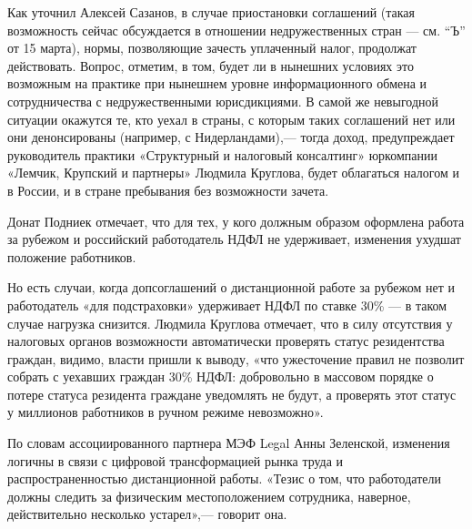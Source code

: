 Как уточнил Алексей Сазанов, в случае приостановки соглашений (такая возможность сейчас обсуждается в отношении недружественных стран — см. “Ъ” от 15 марта), нормы, позволяющие зачесть уплаченный налог, продолжат действовать. Вопрос, отметим, в том, будет ли в нынешних условиях это возможным на практике при нынешнем уровне информационного обмена и сотрудничества с недружественными юрисдикциями. В самой же невыгодной ситуации окажутся те, кто уехал в страны, с которым таких соглашений нет или они денонсированы (например, с Нидерландами),— тогда доход, предупреждает руководитель практики «Структурный и налоговый консалтинг» юркомпании «Лемчик, Крупский и партнеры» Людмила Круглова, будет облагаться налогом и в России, и в стране пребывания без возможности зачета.

\begin{fancyquotes}
    Донат Подниек отмечает, что для тех, у кого должным образом оформлена работа за рубежом и российский работодатель НДФЛ не удерживает, изменения ухудшат положение работников.
\end{fancyquotes}

Но есть случаи, когда допсоглашений о дистанционной работе за рубежом нет и работодатель «для подстраховки» удерживает НДФЛ по ставке 30\% — в таком случае нагрузка снизится. Людмила Круглова отмечает, что в силу отсутствия у налоговых органов возможности автоматически проверять статус резидентства граждан, видимо, власти пришли к выводу, «что ужесточение правил не позволит собрать с уехавших граждан 30\% НДФЛ: добровольно в массовом порядке о потере статуса резидента граждане уведомлять не будут, а проверять этот статус у миллионов работников в ручном режиме невозможно».

По словам ассоциированного партнера МЭФ Legal Анны Зеленской, изменения логичны в связи с цифровой трансформацией рынка труда и распространенностью дистанционной работы. «Тезис о том, что работодатели должны следить за физическим местоположением сотрудника, наверное, действительно несколько устарел»,— говорит она.
